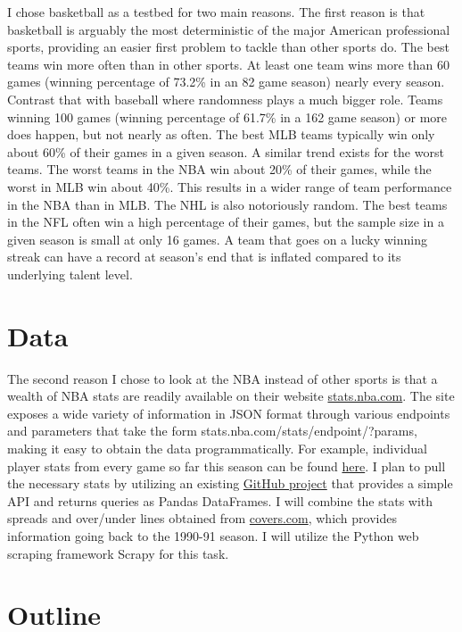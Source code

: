\documentclass{article}
\begin{document}
I chose basketball as a testbed for two main reasons. The first reason is that basketball is arguably the most deterministic of the major American professional sports, providing an easier first problem to tackle than other sports do. The best teams win more often than in other sports. At least one team wins more than 60 games (winning percentage of 73.2\% in an 82 game season) nearly every season. Contrast that with baseball where randomness plays a much bigger role. Teams winning 100 games (winning percentage of 61.7\% in a 162 game season) or more does happen, but not nearly as often. The best MLB teams typically win only about 60\% of their games in a given season. A similar trend exists for the worst teams. The worst teams in the NBA win about 20\% of their games, while the worst in MLB win about 40\%. This results in a wider range of team performance in the NBA than in MLB. The NHL is also notoriously random. The best teams in the NFL often win a high percentage of their games, but the sample size in a given season is small at only 16 games. A team that goes on a lucky winning streak can have a record at season's end that is inflated compared to its underlying talent level.

\section{Data}

The second reason I chose to look at the NBA instead of other sports is that a wealth of NBA stats are readily available on their website \url{stats.nba.com}. The site exposes a wide variety of information in JSON format through various endpoints and parameters that take the form stats.nba.com/stats/{endpoint}/?{params}, making it easy to obtain the data programmatically. For example, individual player stats from every game so far this season can be found \href{http://stats.nba.com/stats/leaguegamelog/?LeagueID=00&Season=2016-17&SeasonType=Regular\%20Season&PlayerOrTeam=P&Sorter=PTS&Direction=DESC}{here}. I plan to pull the necessary  stats by utilizing an existing \href{https://github.com/seemethere/nba_py}{GitHub project} that provides a simple API and returns queries as Pandas DataFrames. I will combine the stats with spreads and over/under lines obtained from \url{covers.com}, which provides information going back to the 1990-91 season. I will utilize the Python web scraping framework Scrapy for this task.

\section{Outline}
\end{document}
